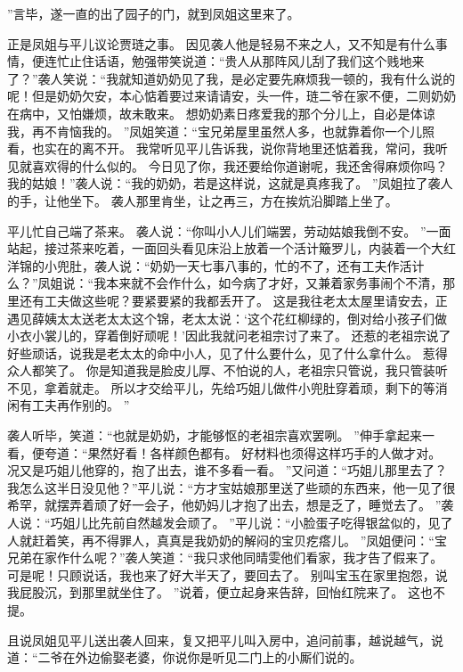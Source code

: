 ”言毕，遂一直的出了园子的门，就到凤姐这里来了。
\par
正是凤姐与平儿议论贾琏之事。
因见袭人他是轻易不来之人，又不知是有什么事情，便连忙止住话语，勉强带笑说道：“贵人从那阵风儿刮了我们这个贱地来了？”袭人笑说：“我就知道奶奶见了我，是必定要先麻烦我一顿的，我有什么说的呢！但是奶奶欠安，本心惦着要过来请请安，头一件，琏二爷在家不便，二则奶奶在病中，又怕嫌烦，故未敢来。
想奶奶素日疼爱我的那个分儿上，自必是体谅我，再不肯恼我的。
”凤姐笑道：“宝兄弟屋里虽然人多，也就靠着你一个儿照看，也实在的离不开。
我常听见平儿告诉我，说你背地里还惦着我，常问，我听见就喜欢得的什么似的。
今日见了你，我还要给你道谢呢，我还舍得麻烦你吗？我的姑娘！”袭人说：“我的奶奶，若是这样说，这就是真疼我了。
”凤姐拉了袭人的手，让他坐下。
袭人那里肯坐，让之再三，方在挨炕沿脚踏上坐了。
\par
平儿忙自己端了茶来。
袭人说：“你叫小人儿们端罢，劳动姑娘我倒不安。
”一面站起，接过茶来吃着，一面回头看见床沿上放着一个活计簸罗儿，内装着一个大红洋锦的小兜肚，袭人说：“奶奶一天七事八事的，忙的不了，还有工夫作活计么？”凤姐说：“我本来就不会作什么，如今病了才好，又兼着家务事闹个不清，那里还有工夫做这些呢？要紧要紧的我都丢开了。
这是我往老太太屋里请安去，正遇见薛姨太太送老太太这个锦，老太太说：‘这个花红柳绿的，倒对给小孩子们做小衣小裳儿的，穿着倒好顽呢！’因此我就问老祖宗讨了来了。
还惹的老祖宗说了好些顽话，说我是老太太的命中小人，见了什么要什么，见了什么拿什么。
惹得众人都笑了。
你是知道我是脸皮儿厚、不怕说的人，老祖宗只管说，我只管装听不见，拿着就走。
所以才交给平儿，先给巧姐儿做件小兜肚穿着顽，剩下的等消闲有工夫再作别的。
”\par
袭人听毕，笑道：“也就是奶奶，才能够怄的老祖宗喜欢罢咧。
”伸手拿起来一看，便夸道：“果然好看！各样颜色都有。
好材料也须得这样巧手的人做才对。
况又是巧姐儿他穿的，抱了出去，谁不多看一看。
”又问道：“巧姐儿那里去了？我怎么这半日没见他？”平儿说：“方才宝姑娘那里送了些顽的东西来，他一见了很希罕，就摆弄着顽了好一会子，他奶妈儿才抱了出去，想是乏了，睡觉去了。
”袭人说：“巧姐儿比先前自然越发会顽了。
”平儿说：“小脸蛋子吃得银盆似的，见了人就赶着笑，再不得罪人，真真是我奶奶的解闷的宝贝疙瘩儿。
”凤姐便问：“宝兄弟在家作什么呢？”袭人笑道：“我只求他同晴雯他们看家，我才告了假来了。
可是呢！只顾说话，我也来了好大半天了，要回去了。
别叫宝玉在家里抱怨，说我屁股沉，到那里就坐住了。
”说着，便立起身来告辞，回怡红院来了。
这也不提。
\par
且说凤姐见平儿送出袭人回来，复又把平儿叫入房中，追问前事，越说越气，说道：“二爷在外边偷娶老婆，你说你是听见二门上的小厮们说的。
